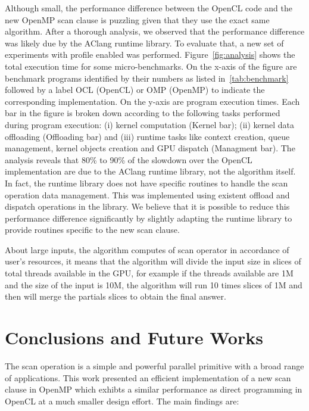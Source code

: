 \documentclass[Ingles]{ic-tese-v1}
\begin{document}
Although small, the performance difference between the OpenCL code and
the new OpenMP  scan clause is puzzling given that  they use the exact
same   algorithm.  After a thorough analysis, we observed that the performance
difference was likely due by  the AClang runtime library.  To evaluate
that, a  new set of  experiments with profile enabled  was performed.
Figure~\ref{fig:analysis}  shows the  total  execution  time for  some
micro-benchmarks.  On the x-axis of  the figure are benchmark programs
identified by their numbers as  listed in~\ref{tab:benchmark} followed by
a label  OCL (OpenCL)  or OMP (OpenMP)  to indicate  the corresponding
implementation. On the  y-axis are program execution  times.  Each bar
in  the  figure  is  broken  down according  to  the  following  tasks
performed  during program  execution: (i)  kernel computation  (Kernel
bar);  (ii) kernel  data offloading  (Offloading bar)  and (iii)  runtime
tasks like context creation, queue management, kernel objects creation
and GPU dispatch  (Managment bar).  The analysis reveals  that 80\% to
90\% of  the slowdown over  the OpenCL  implementation are due  to the
AClang  runtime  library, not  the  algorithm  itself.  In  fact,  the
runtime library  does not  have specific routines  to handle  the scan
operation  data management.   This was  implemented using  existent
offload and dispatch operations in the library.  We believe that it is
possible  to  reduce  this  performance  difference  significantly  by
slightly adapting the runtime library  to provide routines specific to
the new scan clause.

About large inputs, the algorithm computes  of scan operator
in accordance of user's resources, it means that the algorithm will
divide the input size in slices of total threads available in the GPU,
for example if the threads available are 1M and the size of the input
is 10M, the algorithm will run 10 times slices of 1M and then will
merge the partials slices to obtain the final answer.

\chapter{Conclusions and Future Works}
\label{cap:Conclusion}

The scan operation is a simple  and powerful parallel primitive with a
broad  range  of  applications.   This  work  presented  an  efficient
implementation of a new scan clause in OpenMP which exhibts
a similar performance as direct programming in OpenCL at a much
smaller design effort. The main findings are:
\end{document}
